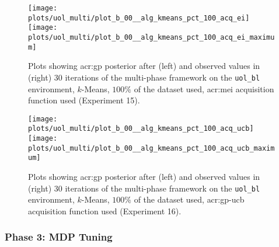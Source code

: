 \begin{figure}[t!]
	\centering
	\texttt{[image: plots/uol\_multi/plot\_b\_00\_\_alg\_kmeans\_pct\_100\_acq\_ei]}
	\texttt{[image: plots/uol\_multi/plot\_b\_00\_\_alg\_kmeans\_pct\_100\_acq\_ei\_maximum]}
	\caption{Plots showing \acrshort{acr:gp} posterior after (left) and observed values in (right) 30 iterations of the multi-phase framework on the \texttt{uol\_bl} environment, $k$-Means, $100\%$ of the dataset used, \acrshort{acr:mei} acquisition function used (Experiment 15).}
	\label{fig:exp15}
\end{figure}
\begin{figure}[t!]
	\centering
	\texttt{[image: plots/uol\_multi/plot\_b\_00\_\_alg\_kmeans\_pct\_100\_acq\_ucb]}
	\texttt{[image: plots/uol\_multi/plot\_b\_00\_\_alg\_kmeans\_pct\_100\_acq\_ucb\_maximum]}
	\caption{Plots showing \acrshort{acr:gp} posterior after (left) and observed values in (right) 30 iterations of the multi-phase framework on the \texttt{uol\_bl} environment, $k$-Means, $100\%$ of the dataset used, \acrshort{acr:gp-ucb} acquisition function used (Experiment 16).}
	\label{fig:exp16}
\end{figure}


\newpage
\subsubsection{Phase 3: MDP Tuning}

